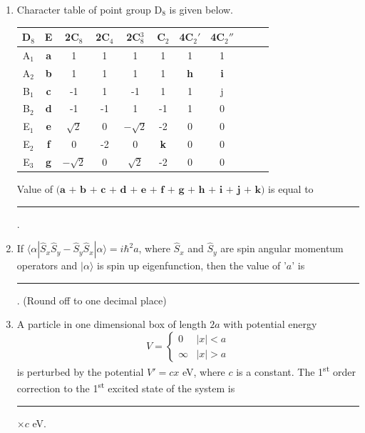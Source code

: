 \documentclass[journal,12pt,onecolumn]{IEEEtran}
\theoremstyle{remark}
\begin{document}
\begin{enumerate}
\item Character table of point group D\(_8\) is given below.

\begin{table}[H]
    \centering
    \setlength{\tabcolsep}{6pt}
    \renewcommand{\arraystretch}{1.3}
    \begin{tabular}{c|cccccccccc}
        D\(_8\) & E & 2C\(_8\) & 2C\(_4\) & 2C\(_8^3\) & C\(_2\) & 4C\(_2'\) & 4C\(_2''\) \\
        \hline
        A\(_1\) & \textbf{a} & 1 & 1 & 1 & 1 & 1 & 1 \\
        A\(_2\) & \textbf{b} & 1 & 1 & 1 & 1 & \textbf{h} & \textbf{i} \\
        B\(_1\) & \textbf{c} & -1 & 1 & -1 & 1 & 1 & j \\
        B\(_2\) & \textbf{d} & -1 & -1 & 1 & -1 & 1 & 0 \\
        E\(_1\) & \textbf{e} & \(\sqrt{2}\) & 0 & \(-\sqrt{2}\) & -2 & 0 & 0 \\
        E\(_2\) & \textbf{f} & 0 & -2 & 0 & \textbf{k} & 0 & 0 \\
        E\(_3\) & \textbf{g} & \(-\sqrt{2}\) & 0 & \(\sqrt{2}\) & -2 & 0 & 0 \\
    \end{tabular}
\end{table}

Value of \(\textbf{(a + b + c + d + e + f + g + h + i + j + k)}\) is equal to \rule{2cm}{0.15mm}.




\item If \(\langle \alpha | \hat{S}_x \hat{S}_y - \hat{S}_y \hat{S}_x | \alpha \rangle = i\hbar^2 a\), where \(\hat{S}_x\) and \(\hat{S}_y\) are spin angular momentum operators and \(|\alpha\rangle\) is spin up eigenfunction, then the value of '\(a\)' is \rule{2cm}{0.15mm}. (Round off to one decimal place)

\item A particle in one dimensional box of length \(2a\) with potential energy
\[
V = \begin{cases}
0 & |x| < a \\
\infty & |x| > a
\end{cases}
\]
is perturbed by the potential \(V' = cx\) eV, where \(c\) is a constant. The 1\textsuperscript{st} order correction to the 1\textsuperscript{st} excited state of the system is \rule{2cm}{0.15mm} \(\times c\) eV.


\end{enumerate}
\end{document}
